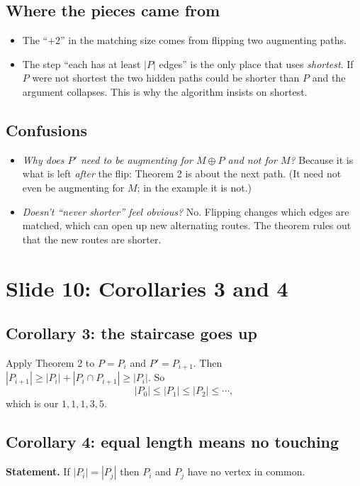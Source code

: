 \documentclass[11pt,a4paper]{article}
\begin{document}
\subsection*{Where the pieces came from}
\begin{itemize}
  \item The ``$+2$'' in the matching size comes from flipping two augmenting paths.
  \item The step ``each has at least $|P|$ edges'' is the only place that uses \emph{shortest}. If $P$ were not shortest the two hidden paths could be shorter than $P$ and the argument collapses. This is why the algorithm insists on shortest.
\end{itemize}

\subsection*{Confusions}
\begin{itemize}
  \item \emph{Why does $P'$ need to be augmenting for $M\oplus P$ and not for $M$?} Because it is what is left \emph{after} the flip: Theorem 2 is about the next path. (It need not even be augmenting for $M$; in the example it is not.)
  \item \emph{Doesn't ``never shorter'' feel obvious?} No. Flipping changes which edges are matched, which can open up new alternating routes. The theorem rules out that the new routes are shorter.
\end{itemize}

\section{Slide 10: Corollaries 3 and 4}
\subsection*{Corollary 3: the staircase goes up}
Apply Theorem 2 to $P=P_i$ and $P'=P_{i+1}$. Then $|P_{i+1}|\ge|P_i|+|P_i\cap P_{i+1}|\ge|P_i|$. So
\[
|P_0|\le|P_1|\le|P_2|\le\cdots,
\]
which is our $1,1,1,3,5$.

\subsection*{Corollary 4: equal length means no touching}
\textbf{Statement.} If $|P_i|=|P_j|$ then $P_i$ and $P_j$ have no vertex in common.
\end{document}
